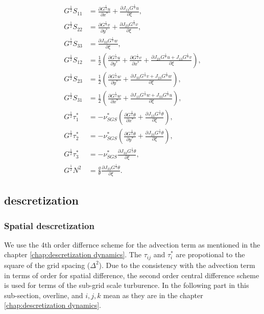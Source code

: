 \begin{align}
  G^{\frac{1}{2}}S_{11} &= \frac{\partial G^{\frac{1}{2}}u}{\partial x^*} + \frac{\partial J_{13}G^{\frac{1}{2}}u}{\partial \xi}, \\
  G^{\frac{1}{2}}S_{22} &= \frac{\partial G^{\frac{1}{2}}v}{\partial y^*} + \frac{\partial J_{23}G^{\frac{1}{2}}v}{\partial \xi}, \\
  G^{\frac{1}{2}}S_{33} &= \frac{\partial J_{33}G^{\frac{1}{2}}w}{\partial \xi}, \\
  G^{\frac{1}{2}}S_{12} &= \frac{1}{2}\left(\frac{\partial G^{\frac{1}{2}}u}{\partial y^*} + \frac{\partial G^{\frac{1}{2}}v}{\partial x^*} + \frac{\partial J_{23}G^{\frac{1}{2}}u + J_{13}G^{\frac{1}{2}}v}{\partial \xi}\right), \\
  G^{\frac{1}{2}}S_{23} &= \frac{1}{2}\left(\frac{\partial G^{\frac{1}{2}}w}{\partial y^*} + \frac{\partial J_{33}G^{\frac{1}{2}}v + J_{23}G^{\frac{1}{2}}w}{\partial \xi}\right), \\
  G^{\frac{1}{2}}S_{31} &= \frac{1}{2}\left(\frac{\partial G^{\frac{1}{2}}w}{\partial x^*} + \frac{\partial J_{13}G^{\frac{1}{2}}w + J_{33}G^{\frac{1}{2}}u}{\partial \xi}\right), \\
  G^{\frac{1}{2}}\tau^*_1 &= -\nu^*_{SGS}\left(
   \frac{\partial G^{\frac{1}{2}}\theta}{\partial x^*}
  +\frac{\partial J_{13}G^{\frac{1}{2}}\theta}{\partial \xi} \right), \\
  G^{\frac{1}{2}}\tau^*_2 &= -\nu^*_{SGS}\left(
   \frac{\partial G^{\frac{1}{2}}\theta}{\partial y^*}
  +\frac{\partial J_{23}G^{\frac{1}{2}}\theta}{\partial \xi} \right), \\
  G^{\frac{1}{2}}\tau^*_3 &= -\nu^*_{SGS}
  \frac{\partial J_{33}G^{\frac{1}{2}}\theta}{\partial \xi}, \\
  G^{\frac{1}{2}} N^2 &= \frac{g}{\theta}\frac{\partial J_{33}G^{\frac{1}{2}}\theta}{\partial \xi}.
\end{align}



\subsection{descretization}

\subsubsection{Spatial descretization}
We use the 4th order differnce scheme for the advection term as mentioned
in the chapter \ref{chap:descretization dynamics}.
The $\tau_{ij}$ and $\tau^*_{i}$ are propotional to
the square of the grid spacing ($\Delta^2$).
Due to the consistency with the advection term
in terms of order for spatial difference,
the second order central difference scheme
is used for terms of the sub-grid scale turburence.
In the following part in this sub-section,
overline, and $i,j,k$ mean
as they are in the chapter \ref{chap:descretization dynamics}.

